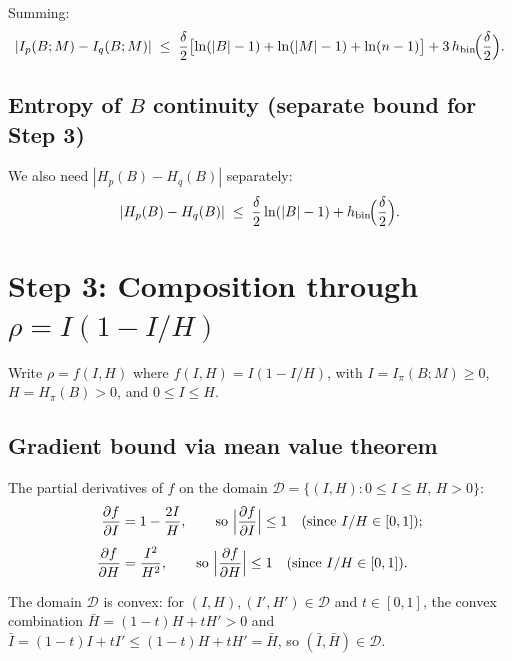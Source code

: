\documentclass[11pt]{article}
\begin{document}
Summing:
\begin{equation}\label{eq:MI-bound}
  |I_p(B;M) - I_q(B;M)| \;\le\;
  \frac{\delta}{2}\bigl[\ln(|B|-1) + \ln(|M|-1) + \ln(n-1)\bigr]
  + 3\,h_{\mathrm{bin}}\!\Bigl(\frac{\delta}{2}\Bigr).
\end{equation}

\subsection{Entropy of $B$ continuity (separate bound for Step 3)}

We also need $|H_p(B) - H_q(B)|$ separately:
\begin{equation}\label{eq:HB-bound}
  |H_p(B) - H_q(B)| \;\le\;
  \frac{\delta}{2}\ln(|B|-1) + h_{\mathrm{bin}}\!\Bigl(\frac{\delta}{2}\Bigr).
\end{equation}

\section{Step 3: Composition through $\rho = I(1 - I/H)$}

Write $\rho = f(I, H)$ where $f(I, H) = I(1 - I/H)$, with
$I = I_\pi(B;M) \ge 0$, $H = H_\pi(B) > 0$, and $0 \le I \le H$.

\subsection{Gradient bound via mean value theorem}

The partial derivatives of $f$ on the domain $\mathcal{D} = \{(I,H) : 0 \le I \le H,\, H > 0\}$:
\begin{align}
  \frac{\partial f}{\partial I} &= 1 - \frac{2I}{H},
  \qquad\text{so } \Bigl|\frac{\partial f}{\partial I}\Bigr| \le 1
  \quad\text{(since $I/H \in [0,1]$)}; \label{eq:df-dI}\\[4pt]
  \frac{\partial f}{\partial H} &= \frac{I^2}{H^2},
  \qquad\text{so } \Bigl|\frac{\partial f}{\partial H}\Bigr| \le 1
  \quad\text{(since $I/H \in [0,1]$)}. \label{eq:df-dH}
\end{align}

The domain $\mathcal{D}$ is convex: for $(I,H), (I',H') \in \mathcal{D}$
and $t \in [0,1]$, the convex combination
$\bar{H} = (1-t)H + tH' > 0$ and
$\bar{I} = (1-t)I + tI' \le (1-t)H + tH' = \bar{H}$, so
$(\bar{I},\bar{H}) \in \mathcal{D}$.
\end{document}
